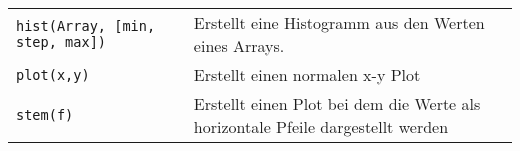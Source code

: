 \begin{tabularx}{\textwidth}{p{7cm} p{11cm}}
    \texttt{hist(Array, [min, step, max])} &
    Erstellt eine Histogramm aus den Werten eines Arrays.
  \\
    \texttt{plot(x,y)} &
    Erstellt einen normalen x-y Plot
  \\
    \texttt{stem(f)} &
    Erstellt einen Plot bei dem die Werte als horizontale Pfeile dargestellt
    werden
\end{tabularx}
    